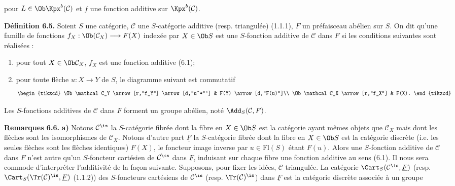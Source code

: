 pour \(L\in\Ob\Kpx^b(\mathcal C)\) et \(f\) une fonction additive sur \(\Kpx^b(\mathcal C)\).

\textbf{Définition 6.5.} Soient \(S\) une catégorie, \(\mathcal C\) une \(S\)-catégorie additive (resp. triangulée) (1.1.1), \(F\) un préfaisceau abélien sur \(S\). On dit qu'une famille de fonctions \(f_X:\Ob(\mathcal C_X)\longrightarrow F(X)\) indexée par \(X\in\Ob S\) est une \(S\)-fonction additive de \(\mathcal C\) dans \(F\) si les conditions suivantes sont réalisées :
\begin{enumerate}[label=(\roman*)]
\item pour tout \(X\in\Ob\mathcal C_X\), \(f_X\) est une fonction additive (6.1);
\item pour toute flèche \(u:X\to Y\) de \(S\), le diagramme suivant est commutatif
\[
\begin{tikzcd}
\Ob\mathcal C_Y \arrow[r,"f_Y"] \arrow[d,"u^*"'] & F(Y) \arrow[d,"F(u)"]\\
\Ob\mathcal C_X \arrow[r,"f_X"] & F(X).
\end{tikzcd}
\]
\end{enumerate}
Les \(S\)-fonctions additives de \(\mathcal C\) dans \(F\) forment un groupe abélien, noté \(\Add_S(\mathcal C,F)\).

\textbf{Remarques 6.6.} \textbf{a)} Notons \(\mathcal C^{\is}\) la \(S\)-catégorie fibrée dont la fibre en \(X\in\Ob S\) est la catégorie ayant mêmes objets que \(\mathcal C_X\) mais dont les flèches sont les isomorphismes de \(\mathcal C_X\). Notons d'autre part \(\underline F\) la \(S\)-catégorie fibrée dont la fibre en \(X\in\Ob S\) est la catégorie discrète (i.e. les seules flèches sont les flèches identiques) \(F(X)\), le foncteur image inverse par \(u\in\mathrm{Fl}(S)\) étant \(F(u)\). Alors une \(S\)-fonction additive de \(\mathcal C\) dans \(F\) n'est autre qu'un \(S\)-foncteur cartésien de \(\mathcal C^{\is}\) dans \(\underline F\), induisant sur chaque fibre une fonction additive au sens (6.1). Il nous sera commode d'interpréter l'additivité de la façon suivante. Supposons, pour fixer les idées, \(\mathcal C\) triangulée. La catégorie \(\Cart_S(\mathcal C^{\is},\underline F)\) (resp. \(\Cart_S(\Tr(\mathcal C)^{\is},\underline F)\) (1.1.2)) des \(S\)-foncteurs cartésiens de \(\mathcal C^{\is}\) (resp. \(\Tr(\mathcal C)^{\is}\)) dans \(\underline F\) est la catégorie discrète associée à un groupe
